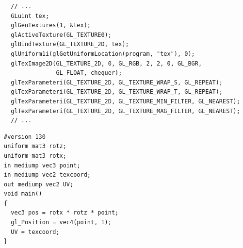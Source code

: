 \documentclass[calcdimensions,landscape,letterpaper]{powersem}
\newcommand{\thecurrentheading}{}
\newcommand{\heading}[1]{\renewcommand{\thecurrentheading}{#1}}
\begin{document}
\begin{slide}
    \heading{Texture Setup}
    \begin{center}
        \begin{minipage}[c]{\textwidth}
            \begin{verbatim}
  // ...
  GLuint tex;
  glGenTextures(1, &tex);
  glActiveTexture(GL_TEXTURE0);
  glBindTexture(GL_TEXTURE_2D, tex);
  glUniform1i(glGetUniformLocation(program, "tex"), 0);
  glTexImage2D(GL_TEXTURE_2D, 0, GL_RGB, 2, 2, 0, GL_BGR,
               GL_FLOAT, chequer);
  glTexParameteri(GL_TEXTURE_2D, GL_TEXTURE_WRAP_S, GL_REPEAT);
  glTexParameteri(GL_TEXTURE_2D, GL_TEXTURE_WRAP_T, GL_REPEAT);
  glTexParameteri(GL_TEXTURE_2D, GL_TEXTURE_MIN_FILTER, GL_NEAREST);
  glTexParameteri(GL_TEXTURE_2D, GL_TEXTURE_MAG_FILTER, GL_NEAREST);
  // ...
            \end{verbatim}
        \end{minipage}
    \end{center}
\end{slide}

\begin{slide}
    \heading{Textured Quad}
    \begin{center}
    \end{center}
\end{slide}

\begin{slide}
    \heading{3D Rotations}
    \begin{center}
        \begin{minipage}[c]{.5\textwidth}
            \begin{verbatim}
#version 130
uniform mat3 rotz;
uniform mat3 rotx;
in mediump vec3 point;
in mediump vec2 texcoord;
out mediump vec2 UV;
void main()
{
  vec3 pos = rotx * rotz * point;
  gl_Position = vec4(point, 1);
  UV = texcoord;
}
            \end{verbatim}
        \end{minipage}
    \end{center}
\end{slide}
\end{document}
